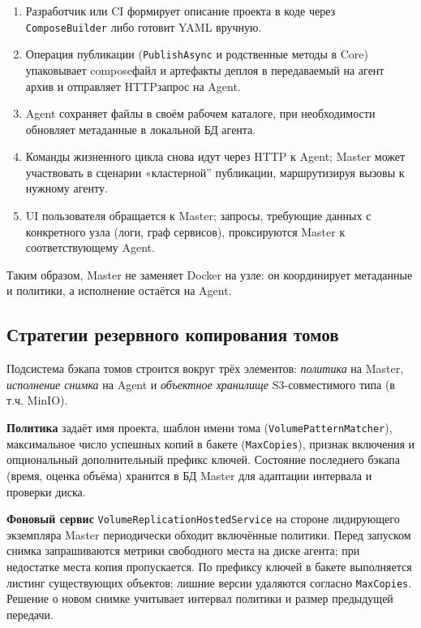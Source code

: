 \begin{enumerate}[leftmargin=1.5cm]
  \item Разработчик или CI формирует описание проекта в коде через \texttt{Compose\-Builder} либо готовит YAML вручную.
  \item Операция публикации (\texttt{Publish\-Async} и родственные методы в Core) упаковывает compose\-файл и артефакты деплоя в передаваемый на агент архив и отправляет HTTP\-запрос на Agent.
  \item Agent сохраняет файлы в своём рабочем каталоге, при необходимости обновляет метаданные в локальной БД агента.
  \item Команды жизненного цикла снова идут через HTTP к Agent; Master может участвовать в сценарии «кластерной'' публикации, маршрутизируя вызовы к нужному агенту.
  \item UI пользователя обращается к Master; запросы, требующие данных с конкретного узла (логи, граф сервисов), проксируются Master к соответствующему Agent.
\end{enumerate}

Таким образом, Master не заменяет Docker на узле: он координирует метаданные и политики, а исполнение остаётся на Agent.

\subsection{Стратегии резервного копирования томов}

Подсистема бэкапа томов строится вокруг трёх элементов: \emph{политика} на Master, \emph{исполнение снимка} на Agent и \emph{объектное хранилище} S3-совместимого типа (в т.ч. MinIO).

\textbf{Политика} задаёт имя проекта, шаблон имени тома (\texttt{VolumePatternMatcher}), максимальное число успешных копий в бакете (\texttt{MaxCopies}), признак включения и опциональный дополнительный префикс ключей. Состояние последнего бэкапа (время, оценка объёма) хранится в БД Master для адаптации интервала и проверки диска.

\textbf{Фоновый сервис} \texttt{VolumeReplicationHostedService} на стороне лидирующего экземпляра Master периодически обходит включённые политики. Перед запуском снимка запрашиваются метрики свободного места на диске агента; при недостатке места копия пропускается. По префиксу ключей в бакете выполняется листинг существующих объектов; лишние версии удаляются согласно \texttt{MaxCopies}. Решение о новом снимке учитывает интервал политики и размер предыдущей передачи.

